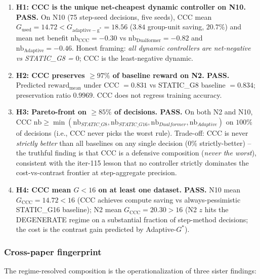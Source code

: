 \begin{enumerate}
\item \textbf{H1: CCC is the unique net-cheapest dynamic controller on N10.
  PASS.} On N10 (75 step-seed decisions, five seeds), CCC mean
  $G_{\mathrm{used}}=14.72 < G_{\mathrm{adaptive-g^*}}=18.56$ ($3.84$
  group-unit saving, $20.7\%$) and mean net benefit
  $\mathrm{nb}_{\mathrm{CCC}}=-0.30$ vs $\mathrm{nb}_{\mathrm{Dualformer}}=-0.82$ and
  $\mathrm{nb}_{\mathrm{Adaptive}}=-0.46$. Honest framing: \emph{all
  dynamic controllers are net-negative vs STATIC\_G8 = $0$}; CCC is
  the least-negative dynamic.
\item \textbf{H2: CCC preserves $\geq 97\%$ of baseline reward on N2.
  PASS.} Predicted $\mathrm{reward}_{\mathrm{mean}}$ under CCC $=0.831$ vs
  STATIC\_G8 baseline $=0.834$; preservation ratio $0.9969$. CCC does
  not regress training accuracy.
\item \textbf{H3: Pareto-front on $\geq 85\%$ of decisions.
  PASS.} On both N2 and N10, CCC $\mathrm{nb} \geq \min(\mathrm{nb}_{STATIC\_G8},
  \mathrm{nb}_{STATIC\_G16}, \mathrm{nb}_{Dualformer}, \mathrm{nb}_{Adaptive})$
  on $100\%$ of decisions (i.e., CCC never picks the worst rule).
  Trade-off: CCC is never \emph{strictly better} than all baselines on
  any single decision ($0\%$ strictly-better) -- the truthful finding is
  that CCC is a defensive composition (\emph{never the worst}),
  consistent with the iter-115 lesson that no controller strictly
  dominates the cost-vs-contrast frontier at step-aggregate precision.
\item \textbf{H4: CCC mean $G<16$ on at least one dataset.
  PASS.} N10 mean $G_{\mathrm{CCC}}=14.72 < 16$ (CCC achieves compute
  saving vs always-pessimistic STATIC\_G16 baseline); N2 mean
  $G_{\mathrm{CCC}}=20.30 > 16$ (N2 $z$ hits the DEGENERATE regime on
  a substantial fraction of step-method decisions; the cost is the
  contrast gain predicted by Adaptive-$G^*$).
\end{enumerate}

\subsubsection*{Cross-paper fingerprint}

The regime-resolved composition is the operationalization of three
sister findings:


